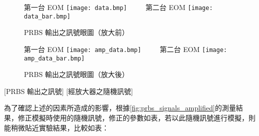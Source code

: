 \documentclass[class=NCU_thesis, crop=false]{standalone}
\begin{document}
\begin{figure}[!hbt]
    \centering
    \subcaptionbox
        {第一台 EOM
        \label{fig:subfig_fig1}}
        {\texttt{[image: data.bmp]}}
    ~~~~
    \subcaptionbox
        {第二台 EOM
        \label{fig:subfig_fig2}}
        {\texttt{[image: data\_bar.bmp]}}
    \caption{PRBS 輸出之訊號眼圖（放大前）}
    \label{fig:prbs_eye}
\end{figure}

\begin{figure}[!hbt]
    \centering
    \subcaptionbox
        {第一台 EOM
        \label{fig:subfig_fig1}}
        {\texttt{[image: amp\_data.bmp]}}
    ~~~~
    \subcaptionbox
        {第二台 EOM
        \label{fig:subfig_fig2}}
        {\texttt{[image: amp\_data\_bar.bmp]}}
    \caption{PRBS 輸出之訊號眼圖（放大後）}
    \label{fig:amp_prbs_eye}
\end{figure}


[PRBS 輸出之訊號]
[經放大器之隨機訊號]

為了確認上述的因素所造成的影響，根據\cref{fig:prbs_signals_amplified}的測量結果，修正模擬時使用的隨機訊號，修正的參數如表，若以此隨機訊號進行模擬，則能稍微貼近實驗結果，比較如表：
\end{document}
